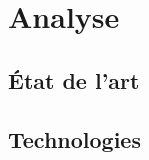 \chapter{Analyse}
\label{ch:analyse}

\section{État de l'art}

\lipsum[1-2]

\section{Technologies}

\lipsum[1-2]
